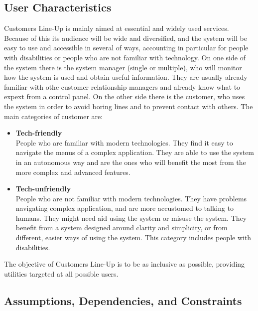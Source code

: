 \subsection{User Characteristics}
Customers Line-Up is mainly aimed at essential and widely used services.
Because of this its audience will be wide and diversified, and the system will be easy to use and accessible in several of ways, accounting in particular for people with disabilities or people who are not familiar with technology.
On one side of the system there is the system manager (single or multiple), who will monitor how the system is used and obtain useful information.
They are usually already familiar with othe customer relationship managers and already know what to expext from a control panel.
On the other side there is the customer, who uses the system in order to avoid boring lines and to prevent contact with others.
The main categories of customer are:
\begin{itemize}
    \item \textbf{Tech-friendly}\\
        People who are familiar with modern technologies. They find it easy to navigate the menus of a complex application.
        They are able to use the system in an autonomous way and are the ones who will benefit the most from the more complex and advanced features.
    \item \textbf{Tech-unfriendly}\\
        People who are not familiar with modern technologies. They have problems navigating complex application, and are more accustomed to talking to humans.
        They might need aid using the system or misuse the system. They benefit from a system designed around clarity and simplicity, or from different, easier ways of using the system.
        This category includes people with disabilities.
\end{itemize}

The objective of Customers Line-Up is to be as inclusive as possible, providing utilities targeted at all possible users.

\subsection{Assumptions, Dependencies, and Constraints}

